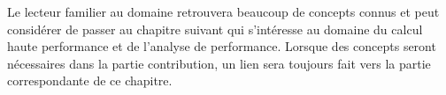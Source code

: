 Le lecteur familier au domaine retrouvera beaucoup de concepts connus et peut considérer de passer au chapitre suivant qui s'intéresse au domaine du calcul haute performance et de l'analyse de performance. Lorsque des concepts seront nécessaires dans la partie contribution, un lien sera toujours fait vers la partie correspondante de ce chapitre.















\printbibliography[heading=references,segment=\therefsegment]
